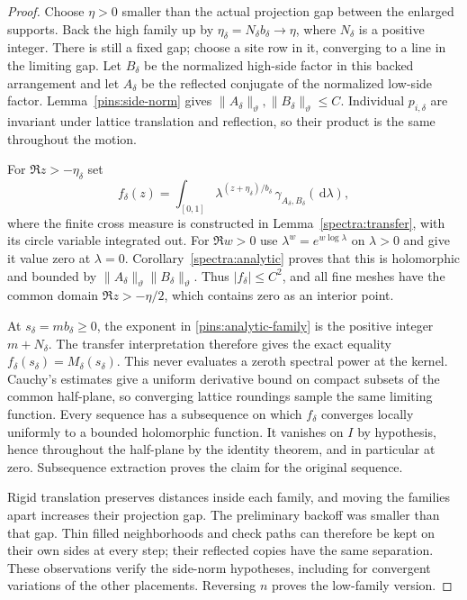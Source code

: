 \documentclass[11pt]{article}
\theoremstyle{definition}
\theoremstyle{remark}
\numberwithin{equation}{section}
\begin{document}
\begin{proof}
Choose $\eta>0$ smaller than the actual projection gap between the
enlarged supports.  Back the high family up by
$\eta_\delta=N_\delta b_\delta\to\eta$, where $N_\delta$ is a
positive integer.  There is still a fixed gap; choose a site row in
it, converging to a line in the limiting gap.  Let $B_\delta$ be the
normalized high-side factor in this backed arrangement and let
$A_\delta$ be the reflected conjugate of the normalized low-side
factor.  Lemma~\ref{pins:side-norm} gives
$\|A_\delta\|_\vartheta,\|B_\delta\|_\vartheta\le C$.
Individual $p_{i,\delta}$ are invariant under lattice translation
and reflection, so their product is the same throughout the motion.

For $\Re z>-\eta_\delta$ set
\begin{equation}\label{pins:analytic-family}
 f_\delta(z)=\int_{[0,1]}
 \lambda^{(z+\eta_\delta)/b_\delta}\,
             \gamma_{A_\delta,B_\delta}(\,\mathrm d\lambda),
\end{equation}
where the finite cross measure is constructed in
Lemma~\ref{spectra:transfer}, with its circle variable integrated out.
For $\Re w>0$ use $\lambda^w=e^{w\log\lambda}$ on $\lambda>0$
and give it value zero at $\lambda=0$.
Corollary~\ref{spectra:analytic} proves that this is holomorphic and
bounded by $\|A_\delta\|_\vartheta\|B_\delta\|_\vartheta$.
Thus $|f_\delta|\le C^2$, and all fine
meshes have the common domain $\Re z>-\eta/2$, which contains zero
as an interior point.

At $s_\delta=m b_\delta\ge0$, the exponent in
\eqref{pins:analytic-family} is the positive integer $m+N_\delta$.
The transfer interpretation therefore gives the exact equality
$f_\delta(s_\delta)=M_\delta(s_\delta)$.  This never evaluates a
zeroth spectral power at the kernel.  Cauchy's estimates give a
uniform derivative bound on compact subsets of the common half-plane,
so converging lattice roundings sample the same limiting function.
Every sequence has a subsequence on which $f_\delta$ converges locally
uniformly to a bounded holomorphic function.  It vanishes on $I$ by
hypothesis, hence throughout the half-plane by the identity theorem,
and in particular at zero.  Subsequence extraction proves the claim
for the original sequence.

Rigid translation preserves distances inside each family, and moving
the families apart increases their projection gap.  The preliminary
backoff was smaller than that gap.  Thin filled neighborhoods and
check paths can therefore be kept on their own sides at every step;
their reflected copies have the same separation.  These observations
verify the side-norm hypotheses, including for convergent variations of
the other placements.  Reversing $n$ proves the low-family version.
\end{proof}
\end{document}

